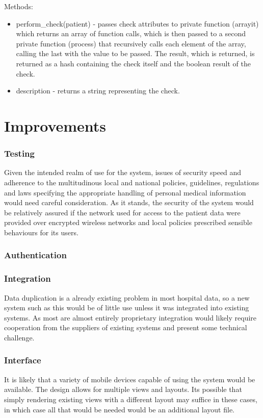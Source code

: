 \documentclass[letterpaper]{amsart}
\begin{document}
Methods:
\begin{itemize}
    \item perform\_check(patient) - passes check attributes to private function (arrayit) which returns an array of function calls, which is then passed to a second private function (process) that recursively calls each element of the array, calling the last with the value to be passed.  The result, which is returned, is returned as a hash containing the check itself and the boolean result of the check. 
    \item description - returns a string representing the check.
\end{itemize}
\part{Improvements}
\section{Testing} 
Given the intended realm of use for the system, issues of security speed and adherence to the multitudinous local and national policies, guidelines, regulations and laws specifying the appropriate handling of personal medical information would need careful consideration.  As it stands, the security of the system would be relatively assured if the network used for access to the patient data were provided over encrypted wireless networks and local policies prescribed sensible behaviours for its users.
\section{Authentication}

\section{Integration}
Data duplication is a already existing problem in most hospital data, so a new system such as this would be of little use unless it was integrated into existing systems.  As most are almost entirely proprietary integration would likely require cooperation from the suppliers of existing systems and present some technical challenge.
\section{Interface}
It is likely that a variety of mobile devices capable of using the system would be available.  The design allows for multiple views and layouts.  Its possible that simply rendering existing views with a different layout may suffice in these cases, in which case all that would be needed would be an additional layout file.
\end{document}
